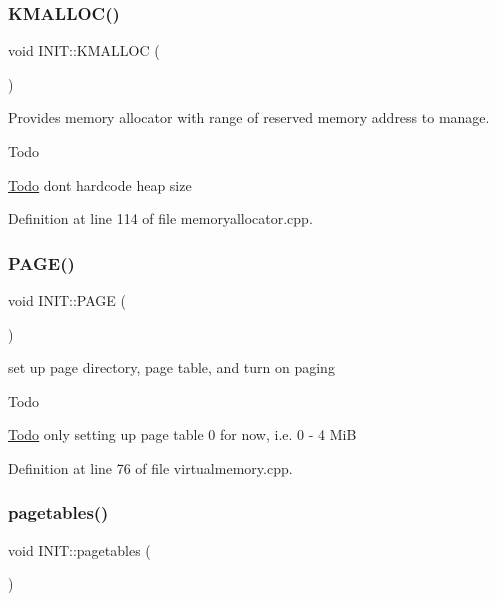 \subsubsection{\texorpdfstring{K\+M\+A\+L\+L\+O\+C()}{KMALLOC()}}
{\footnotesize\ttfamily void I\+N\+I\+T\+::\+K\+M\+A\+L\+L\+OC (\begin{DoxyParamCaption}{ }\end{DoxyParamCaption})}



Provides memory allocator with range of reserved memory address to manage. 

\begin{DoxyRefDesc}{Todo}
\item[\hyperlink{todo__todo000002}{Todo}]don\textquotesingle{}t hardcode heap size \end{DoxyRefDesc}


Definition at line 114 of file memoryallocator.\+cpp.

\mbox{\label{namespace_i_n_i_t_aea383d3de30095cf9d176fa60b66d01d}} 
\subsubsection{\texorpdfstring{P\+A\+G\+E()}{PAGE()}}
{\footnotesize\ttfamily void I\+N\+I\+T\+::\+P\+A\+GE (\begin{DoxyParamCaption}{ }\end{DoxyParamCaption})}



set up page directory, page table, and turn on paging 

\begin{DoxyRefDesc}{Todo}
\item[\hyperlink{todo__todo000003}{Todo}]only setting up page table 0 for now, i.\+e. 0 -\/ 4 MiB \end{DoxyRefDesc}


Definition at line 76 of file virtualmemory.\+cpp.

\mbox{\label{namespace_i_n_i_t_a9e427aa89bec95f574ad21b5e7d9ee8c}} 
\subsubsection{\texorpdfstring{pagetables()}{pagetables()}}
{\footnotesize\ttfamily void I\+N\+I\+T\+::pagetables (\begin{DoxyParamCaption}{ }\end{DoxyParamCaption})}

